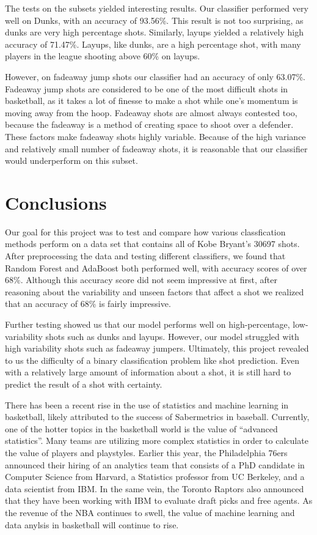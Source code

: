 \documentclass[11pt]{article}
\begin{document}
    The tests on the subsets yielded interesting results. Our classifier performed very well on Dunks, with an accuracy of 93.56\%. This result is not too surprising, as dunks are very high percentage shots. Similarly, layups yielded a relatively high accuracy of 71.47\%. Layups, like dunks, are a high percentage shot, with many players in the league shooting above 60\% on layups. 
    
However, on fadeaway jump shots our classifier had an accuracy of only 63.07\%. Fadeaway jump shots are considered to be one of the most difficult shots in basketball, as it takes a lot of finesse to make a shot while one's momentum is moving away from the hoop. Fadeaway shots are almost always contested too, because the fadeaway is a method of creating space to shoot over a defender. These factors make fadeaway shots highly variable. Because of the high variance and relatively small number of fadeaway shots, it is reasonable that our classifier would underperform on this subset.


\section{Conclusions}

Our goal for this project was to test and compare how various classfication methods perform on a data set that contains all of Kobe Bryant's 30697 shots. After preprocessing the data and testing different classifiers, we found that Random Forest and AdaBoost both performed well, with accuracy scores of over 68\%. Although this accuracy score did not seem impressive at first, after reasoning about the variability and unseen factors that affect a shot we realized that an accuracy of 68\% is fairly impressive.

Further testing showed us that our model performs well on high-percentage, low-variability shots such as dunks and layups. However, our model struggled with high variability shots such as fadeaway jumpers. Ultimately, this project revealed to us the difficulty of a binary classification problem like shot prediction. Even with a relatively large amount of information about a shot, it is still hard to predict the result of a shot with certainty. 

There has been a recent rise in the use of statistics and machine learning in basketball, likely attributed to the success of Sabermetrics in baseball. Currently, one of the hotter topics in the basketball world is the value of ``advanced statistics''. Many teams are utilizing more complex statistics in order to calculate the value of players and playstyles. Earlier this year, the Philadelphia 76ers announced their hiring of an analytics team that consists of a PhD candidate in Computer Science from Harvard, a Statistics professor from UC Berkeley, and a data scientist from IBM. In the same vein, the Toronto Raptors also announced that they have been working with IBM to evaluate draft picks and free agents. As the revenue of the NBA continues to swell, the value of machine learning and data anylsis in basketball will continue to rise.
\end{document}
